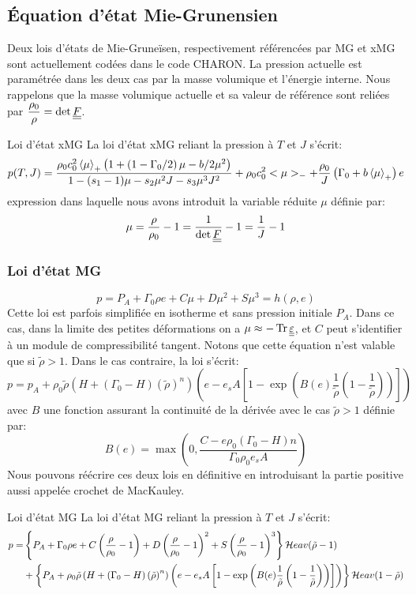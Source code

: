 \documentclass[10pt]{book}
\newcommand{\npart}[1]{<#1>_{-}}
\begin{document}
\subsection{Équation d'état Mie-Grunensien}
Deux lois d'états de Mie-Gruneïsen, respectivement référencées par \og
MG \fg{} et \og xMG \fg{} sont actuellement codées dans le code CHARON. La pression actuelle est paramétrée dans les deux cas par la masse volumique et l'énergie interne. Nous rappelons que la masse volumique actuelle et sa valeur de référence sont reliées par $\dfrac{\rho_{0}}{\rho}=\det\underline{\underline{F}}$.
\begin{Propo}{Loi d'état xMG} La loi d'état xMG reliant la pression à $T$ et $J$ s'écrit:
$$p(T,J)=\dfrac{\rho_{0}c_{0}^{2}\ppart{\mu}\left(1+\left(1-\Gamma_{0}/2\right)\mu-b/2\mu^{2}\right)}{1-(s_{1}-1)\mu-s_{2}\mu^{2}J-s_{3}\mu^{3}J^{2}}+\rho_{0}c_{0}^{2}\npart{\mu}+\dfrac{\rho_{0}}{J}\left(\Gamma_{0}+b\ppart{\mu}\right)e$$
expression dans laquelle nous avons introduit la variable réduite $\mu$ définie par:
$$\mu=\dfrac{\rho}{\rho_{0}}-1=\dfrac{1}{\det\underline{\underline{F}}}-1=\dfrac{1}{J}-1$$
\end{Propo}
\subsubsection{Loi d'état MG}
\begin{equation}
p=P_{A}+\Gamma_{0}\rho e+C\mu+D\mu^{2}+S\mu^{3}=h(\rho,e)
\label{eq:PMG}
\end{equation}
Cette loi est parfois simplifiée en isotherme et sans pression initiale $P_{A}$. Dans ce cas, dans la limite des petites déformations on a $\mu \approx -\tr\DefoHPP$, et $C$ peut s'identifier à un module de compressibilité tangent.
Notons que cette équation n'est valable que si $\tilde{\rho}>1$. Dans le cas contraire, la loi s'écrit:
$$p=p_{A}+\rho_{0}\tilde{\rho}\left(H+(\Gamma_{0}-H)\left(\tilde{\rho}\right)^{n}\right)\left(e-e_{s}A\left[1-\exp\left(B(e)\frac{1}{\tilde{\rho}}\left(1-\frac{1}{\tilde{\rho}}\right)\right)\right]\right)$$
avec $B$ une fonction assurant la continuité de la dérivée avec le cas $\tilde{\rho}>1$ définie par:
$$B(e)=\max\left(0,\dfrac{C-e\rho_{0}(\Gamma_{0}-H)n}{\Gamma_{0}\rho_{0}e_{s}A}\right)$$
Nous pouvons réécrire ces deux lois en définitive en introduisant la partie positive aussi appelée crochet de MacKauley.
\begin{Propo}{Loi d'état MG} La loi d'état MG reliant la pression à $T$ et $J$ s'écrit:
$$\begin{aligned}
p =& \left\{P_{A}+\Gamma_{0}\rho e+C\left(\dfrac{\rho}{\rho_{0}}-1\right)+D\left(\dfrac{\rho}{\rho_{0}}-1\right)^{2}+S\left(\dfrac{\rho}{\rho_{0}}-1\right)^{3}\right\}\mathcal{H}eav(\tilde{\rho}-1)\\
&+\left\{P_{A}+\rho_{0}\tilde{\rho}\left(H+(\Gamma_{0}-H)\left(\tilde{\rho}\right)^{n}\right)\left(e-e_{s}A\left[1-\exp\left(B(e)\frac{1}{\tilde{\rho}}\left(1-\frac{1}{\tilde{\rho}}\right)\right)\right]\right)\right\}\mathcal{H}eav(1-\tilde{\rho})
\end{aligned}$$
\end{Propo}
\end{document}
